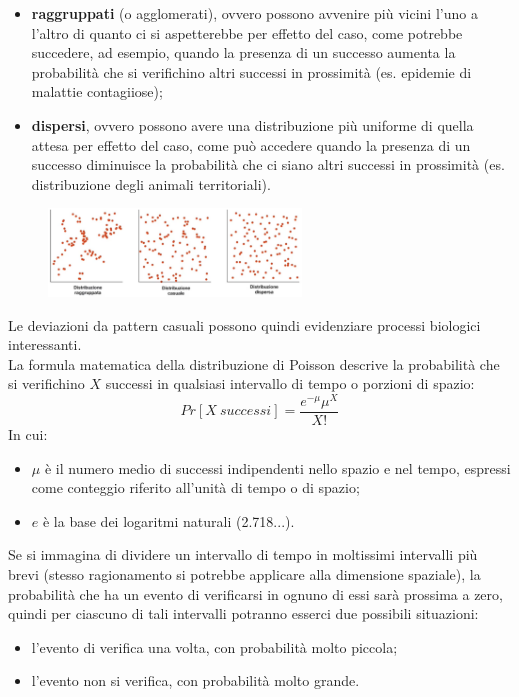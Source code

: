 \documentclass[10pt, draft]{book}
\begin{document}
\begin{itemize}
    \item \textbf{raggruppati} (o agglomerati), ovvero possono avvenire più vicini l'uno a l'altro di quanto ci si aspetterebbe per effetto del caso, come potrebbe succedere, ad esempio, quando la presenza di un successo aumenta la probabilità che si verifichino altri successi in prossimità (es. epidemie di malattie contagiiose);
    \item \textbf{dispersi}, ovvero possono avere una distribuzione più uniforme di quella attesa per effetto del caso, come può accedere quando la presenza di un successo diminuisce la probabilità che ci siano altri successi in prossimità (es. distribuzione degli animali territoriali).
\end{itemize}
    \begin{figure}[h]\label{fig8.6-1}
    \centering
    \includegraphics[width=0.6\textwidth]{fig8.6-1}
    \caption{\small{}}
    \end{figure}
Le deviazioni da pattern casuali possono quindi evidenziare processi biologici interessanti.
\\
La formula matematica della distribuzione di Poisson descrive la probabilità che si verifichino $X$ successi in qualsiasi intervallo di tempo o porzioni di spazio:
\begin{equation}
Pr[X\ successi] = \frac{e^{-\mu}\mu^X}{X!}
\end{equation}
In cui:
\begin{itemize}
    \item \textbf{$\mu$} è il numero medio di successi indipendenti nello spazio e nel tempo, espressi come conteggio riferito all'unità di tempo o di spazio;
    \item \textbf{$e$} è la base dei logaritmi naturali (2.718...).
\end{itemize}
Se si immagina di dividere un intervallo di tempo in moltissimi intervalli più brevi (stesso ragionamento si potrebbe applicare alla dimensione spaziale), la probabilità che ha un evento di verificarsi in ognuno di essi sarà prossima a zero, quindi per ciascuno di tali intervalli potranno esserci due possibili situazioni:
\begin{itemize}
    \item l'evento di verifica una volta, con probabilità molto piccola;
    \item l'evento non si verifica, con probabilità molto grande.
\end{itemize}
\end{document}
